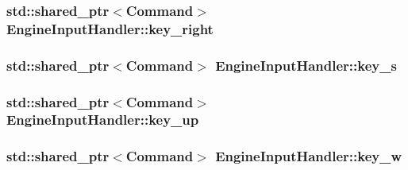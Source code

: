 \subsubsection[{key\+\_\+right}]{\setlength{\rightskip}{0pt plus 5cm}std\+::shared\+\_\+ptr$<${\bf Command}$>$ Engine\+Input\+Handler\+::key\+\_\+right\hspace{0.3cm}{\ttfamily [private]}}\label{class_engine_input_handler_ad74ef644e2130ed5552173993a358b20}
\hypertarget{class_engine_input_handler_ac8cb7f400955f76a2258a64f0812c309}{}
\subsubsection[{key\+\_\+s}]{\setlength{\rightskip}{0pt plus 5cm}std\+::shared\+\_\+ptr$<${\bf Command}$>$ Engine\+Input\+Handler\+::key\+\_\+s\hspace{0.3cm}{\ttfamily [private]}}\label{class_engine_input_handler_ac8cb7f400955f76a2258a64f0812c309}
\hypertarget{class_engine_input_handler_a325f37f96aee129b9fc375c7a784798e}{}
\subsubsection[{key\+\_\+up}]{\setlength{\rightskip}{0pt plus 5cm}std\+::shared\+\_\+ptr$<${\bf Command}$>$ Engine\+Input\+Handler\+::key\+\_\+up\hspace{0.3cm}{\ttfamily [private]}}\label{class_engine_input_handler_a325f37f96aee129b9fc375c7a784798e}
\hypertarget{class_engine_input_handler_adc4f776b64656ce3b549a1efcbba5dfb}{}
\subsubsection[{key\+\_\+w}]{\setlength{\rightskip}{0pt plus 5cm}std\+::shared\+\_\+ptr$<${\bf Command}$>$ Engine\+Input\+Handler\+::key\+\_\+w\hspace{0.3cm}{\ttfamily [private]}}\label{class_engine_input_handler_adc4f776b64656ce3b549a1efcbba5dfb}
\hypertarget{class_engine_input_handler_a1d5d91670520e1424bf5dac389d65069}{}
